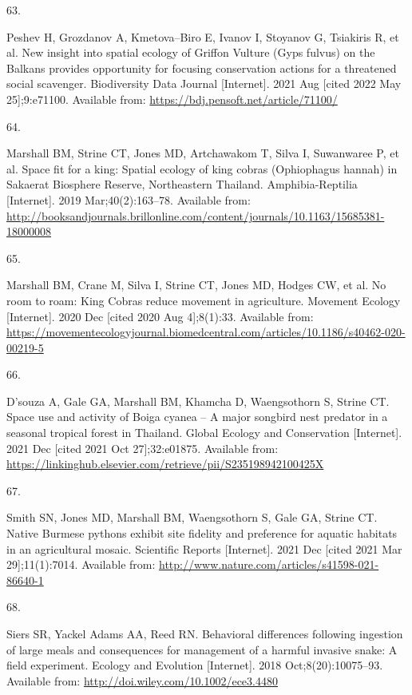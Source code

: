 \documentclass[10pt,a4paper]{article}
\newlength{\cslhangindent}
\newlength{\csllabelwidth}
\newlength{\cslentryspacingunit} %
\newenvironment{CSLReferences}[2] %
 {%
  \setlength{\parindent}{0pt}
  \ifodd #1
  \let\oldpar\par
  \def\par{\hangindent=\cslhangindent\oldpar}
  \fi
  \setlength{\parskip}{#2\cslentryspacingunit}
 }%
 {}
\newcommand{\CSLLeftMargin}[1]{\parbox[t]{\csllabelwidth}{#1}}
\newcommand{\CSLRightInline}[1]{\parbox[t]{\linewidth - \csllabelwidth}{#1}\break}
\begin{document}
\begin{CSLReferences}{0}{0}
\leavevmode{}%
\CSLLeftMargin{63. }
\CSLRightInline{Peshev H, Grozdanov A, Kmetova--Biro E, Ivanov I, Stoyanov G, Tsiakiris R, et al. New insight into spatial ecology of {Griffon} {Vulture} ({Gyps} fulvus) on the {Balkans} provides opportunity for focusing conservation actions for a threatened social scavenger. Biodiversity Data Journal {[}Internet{]}. 2021 Aug {[}cited 2022 May 25{]};9:e71100. Available from: \url{https://bdj.pensoft.net/article/71100/}}

\leavevmode{}%
\CSLLeftMargin{64. }
\CSLRightInline{Marshall BM, Strine CT, Jones MD, Artchawakom T, Silva I, Suwanwaree P, et al. Space fit for a king: Spatial ecology of king cobras ({Ophiophagus} hannah) in {Sakaerat} {Biosphere} {Reserve}, {Northeastern} {Thailand}. Amphibia-Reptilia {[}Internet{]}. 2019 Mar;40(2):163--78. Available from: \url{http://booksandjournals.brillonline.com/content/journals/10.1163/15685381-18000008}}

\leavevmode{}%
\CSLLeftMargin{65. }
\CSLRightInline{Marshall BM, Crane M, Silva I, Strine CT, Jones MD, Hodges CW, et al. No room to roam: {King} {Cobras} reduce movement in agriculture. Movement Ecology {[}Internet{]}. 2020 Dec {[}cited 2020 Aug 4{]};8(1):33. Available from: \url{https://movementecologyjournal.biomedcentral.com/articles/10.1186/s40462-020-00219-5}}

\leavevmode{}%
\CSLLeftMargin{66. }
\CSLRightInline{D'souza A, Gale GA, Marshall BM, Khamcha D, Waengsothorn S, Strine CT. Space use and activity of {Boiga} cyanea -- {A} major songbird nest predator in a seasonal tropical forest in {Thailand}. Global Ecology and Conservation {[}Internet{]}. 2021 Dec {[}cited 2021 Oct 27{]};32:e01875. Available from: \url{https://linkinghub.elsevier.com/retrieve/pii/S235198942100425X}}

\leavevmode{}%
\CSLLeftMargin{67. }
\CSLRightInline{Smith SN, Jones MD, Marshall BM, Waengsothorn S, Gale GA, Strine CT. Native {Burmese} pythons exhibit site fidelity and preference for aquatic habitats in an agricultural mosaic. Scientific Reports {[}Internet{]}. 2021 Dec {[}cited 2021 Mar 29{]};11(1):7014. Available from: \url{http://www.nature.com/articles/s41598-021-86640-1}}

\leavevmode{}%
\CSLLeftMargin{68. }
\CSLRightInline{Siers SR, Yackel Adams AA, Reed RN. Behavioral differences following ingestion of large meals and consequences for management of a harmful invasive snake: {A} field experiment. Ecology and Evolution {[}Internet{]}. 2018 Oct;8(20):10075--93. Available from: \url{http://doi.wiley.com/10.1002/ece3.4480}}


\end{CSLReferences}
\end{document}
